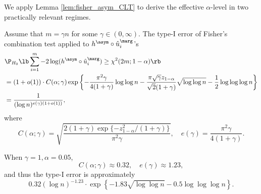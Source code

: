 We apply Lemma \ref{lem:fisher_asym_CLT} to derive the effective $\alpha$-level in two practically relevant regimes.

\begin{thm}\label{thm:fisher_asym_effective_alpha}
  Assume that $m = \gamma n$ for some $\gamma \in (0, \infty)$. The type-I error of Fisher's combination test applied to $h^\asym\circ \hat{u}_i^\marg$'s
  \begin{align*}
    &\P_{H_0}\lb\sum_{i=1}^{m} -2\log(h^\asym \circ \hat{u}_i^\marg)\ge \chi^2(2m; 1 - \alpha)\rb\\
    &= (1 + o(1))\cdot C(\alpha; \gamma)\exp\left\{-\frac{\pi^2 \gamma}{4(1 + \gamma)}\log\log n - \frac{\pi\sqrt{\gamma}z_{1-\alpha}}{\sqrt{2}(1 + \gamma)}\sqrt{\log \log n} - \frac{1}{2}\log\log\log n\right\}\\
    & = \frac{1}{(\log n)^{e(\gamma)(1 + o(1))}},
  \end{align*}
  where
  \[C(\alpha; \gamma) = \sqrt{\frac{2(1 + \gamma)\exp\{-z_{1-\alpha}^2 / (1 + \gamma)\}}{\pi^2\gamma}}, \quad e(\gamma) = \frac{\pi^2 \gamma}{4(1 + \gamma)}.\]
\end{thm}
\begin{remark}
  When $\gamma = 1, \alpha = 0.05$,
  \[C(\alpha; \gamma)\approx 0.32, \quad e(\gamma)\approx 1.23,\]
  and thus the type-I error is approximately
  \[0.32(\log n)^{-1.23} \cdot \exp\left\{-1.83\sqrt{\log\log n} - 0.5\log\log \log n\right\}.\]
\end{remark}

